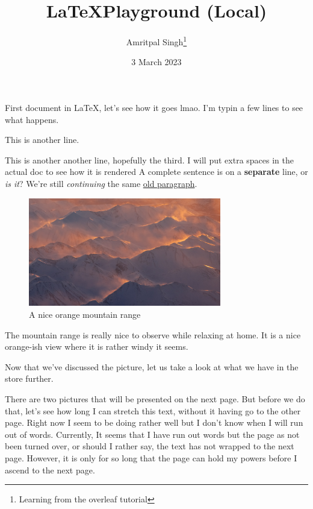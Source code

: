 \documentclass[12pt, a4paper]{article}
\title{\LaTeX \space Playground (Local)}
\author{Amritpal Singh\thanks{Learning from the overleaf tutorial}}
\date{3 March 2023}
\begin{document}
\maketitle
	First document in \LaTeX, let's see how it goes lmao.
	I'm typin a few lines to see what happens.
	
	This is another line.
	
	This is another another line, hopefully the third. I will
	                        put extra spaces in the actual doc
	          to see how it is rendered
	A complete sentence is on a \textbf{separate} line,
	or \textit{is it}? We're still \emph{continuing} the same 
	\underline{old paragraph}.
	\begin{figure}[h]
		\centering
		\includegraphics[width=0.75\textwidth,height=0.25\textheight]{windy}
		\caption{A nice orange mountain range}
		\label{fig:mountains1}
	\end{figure}

	The mountain range is really nice to observe while relaxing
	at home. It is a nice orange-ish view where it is rather windy
	it seems.
	
	Now that we've discussed the picture, let us take a look at
	what we have in the store further.
	
	There are two pictures that will be presented on the next page.
	But before we do that, let's see how long I can stretch this text,
	without it having go to the other page. Right now I seem to be doing 
	rather well but I don't know when I will run out of words. Currently,
	It seems that I have run out words but the page as not been turned over,
	or should I rather say, the text has not wrapped to the next page.
	However, it is only for so long that the page can hold my powers before
	I ascend to the next page.
	
\end{document}
